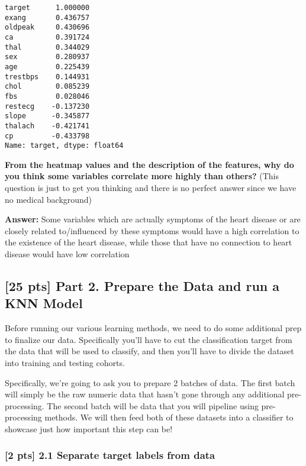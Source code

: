 \documentclass[11pt]{article}
\makeatletter
\newcommand{\boxspacing}{\kern\kvtcb@left@rule\kern\kvtcb@boxsep}
\newcommand{\prompt}[4]{
        {\ttfamily\llap{{\color{#2}[#3]:\hspace{3pt}#4}}\vspace{-\baselineskip}}
    }
\makeatother
\begin{document}
            \begin{tcolorbox}[breakable, size=fbox, boxrule=.5pt, pad at break*=1mm, opacityfill=0]
\prompt{Out}{outcolor}{11}{\boxspacing}
\begin{Verbatim}[commandchars=\\\{\}]
target      1.000000
exang       0.436757
oldpeak     0.430696
ca          0.391724
thal        0.344029
sex         0.280937
age         0.225439
trestbps    0.144931
chol        0.085239
fbs         0.028046
restecg    -0.137230
slope      -0.345877
thalach    -0.421741
cp         -0.433798
Name: target, dtype: float64
\end{Verbatim}
\end{tcolorbox}
        
    \textbf{From the heatmap values and the description of the features, why
do you think some variables correlate more highly than others?} (This
question is just to get you thinking and there is no perfect answer
since we have no medical background)

    \textbf{Answer:} Some variables which are actually symptoms of the heart
disease or are closely related to/influenced by these symptoms would
have a high correlation to the existence of the heart disease, while
those that have no connection to heart disease would have low
correlation

    \hypertarget{pts-part-2.-prepare-the-data-and-run-a-knn-model}{%
\subsection{{[}25 pts{]} Part 2. Prepare the Data and run a KNN
Model}\label{pts-part-2.-prepare-the-data-and-run-a-knn-model}}

    Before running our various learning methods, we need to do some
additional prep to finalize our data. Specifically you'll have to cut
the classification target from the data that will be used to classify,
and then you'll have to divide the dataset into training and testing
cohorts.

Specifically, we're going to ask you to prepare 2 batches of data. The
first batch will simply be the raw numeric data that hasn't gone through
any additional pre-processing. The second batch will be data that you
will pipeline using pre-processing methods. We will then feed both of
these datasets into a classifier to showcase just how important this
step can be!

    \hypertarget{pts-2.1-separate-target-labels-from-data}{%
\subsubsection{{[}2 pts{]} 2.1 Separate target labels from
data}\label{pts-2.1-separate-target-labels-from-data}}
\end{document}
